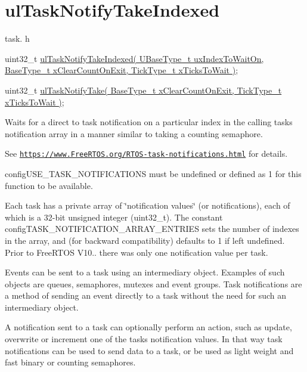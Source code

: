 \hypertarget{group__ul_task_notify_take_indexed}{}\section{ul\+Task\+Notify\+Take\+Indexed}
\label{group__ul_task_notify_take_indexed}
task. h 
\begin{DoxyPre}
uint32\_t \hyperlink{externals_2freertos_2include_2task_8h_a4f42982425f3b106e1a9f19b41ba4124}{ulTaskNotifyTakeIndexed( UBaseType\_t uxIndexToWaitOn, BaseType\_t xClearCountOnExit, TickType\_t xTicksToWait )};\end{DoxyPre}



\begin{DoxyPre}uint32\_t \hyperlink{externals_2freertos_2include_2task_8h_a725a2da114ef870747edd7fd19d77bab}{ulTaskNotifyTake( BaseType\_t xClearCountOnExit, TickType\_t xTicksToWait )};
\end{DoxyPre}


Waits for a direct to task notification on a particular index in the calling task\textquotesingle{}s notification array in a manner similar to taking a counting semaphore.

See \href{https://www.FreeRTOS.org/RTOS-task-notifications.html}{\tt https\+://www.\+Free\+R\+T\+O\+S.\+org/\+R\+T\+O\+S-\/task-\/notifications.\+html} for details.

config\+U\+S\+E\+\_\+\+T\+A\+S\+K\+\_\+\+N\+O\+T\+I\+F\+I\+C\+A\+T\+I\+O\+NS must be undefined or defined as 1 for this function to be available.

Each task has a private array of \char`\"{}notification values\char`\"{} (or \textquotesingle{}notifications\textquotesingle{}), each of which is a 32-\/bit unsigned integer (uint32\+\_\+t). The constant config\+T\+A\+S\+K\+\_\+\+N\+O\+T\+I\+F\+I\+C\+A\+T\+I\+O\+N\+\_\+\+A\+R\+R\+A\+Y\+\_\+\+E\+N\+T\+R\+I\+ES sets the number of indexes in the array, and (for backward compatibility) defaults to 1 if left undefined. Prior to Free\+R\+T\+OS V10.. there was only one notification value per task.

Events can be sent to a task using an intermediary object. Examples of such objects are queues, semaphores, mutexes and event groups. Task notifications are a method of sending an event directly to a task without the need for such an intermediary object.

A notification sent to a task can optionally perform an action, such as update, overwrite or increment one of the task\textquotesingle{}s notification values. In that way task notifications can be used to send data to a task, or be used as light weight and fast binary or counting semaphores.

